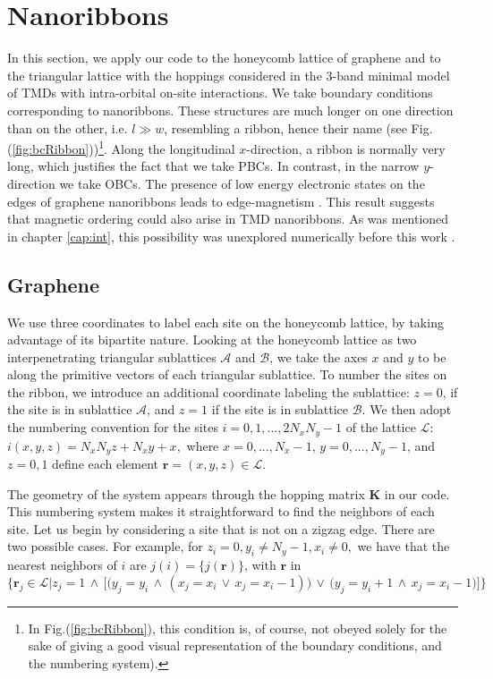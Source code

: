 \section{Nanoribbons}
\label{sec:nanoribbon}

In this section, we apply our code to the honeycomb lattice of graphene and to the triangular lattice with the hoppings considered in the 3-band minimal model of \acs{TMD}s with intra-orbital on-site interactions.
We take boundary conditions corresponding to nanoribbons.
These structures are much longer on one direction than on the other, i.e. $l \gg w$, resembling a ribbon, hence their name (see Fig.(\ref{fig:bcRibbon}))\footnote{In Fig.(\ref{fig:bcRibbon}), this condition is, of course, not obeyed solely for the sake of giving a good visual representation of the boundary conditions, and the numbering system).}.
Along the longitudinal $x$-direction, a ribbon is normally very long, which justifies the fact that we take \acp{PBC}.
In contrast, in the narrow $y$-direction we take \acp{OBC}.
The presence of low energy electronic states on the edges of graphene nanoribbons leads to edge-magnetism  \cite{yazyev_emergence_2010}.
This result suggests that magnetic ordering could also arise in \acs{TMD} nanoribbons.
As was mentioned in chapter \ref{cap:int}, this possibility was unexplored numerically before this work \cite{feldner_dynamical_2011, golor_quantum_2013}.

\subsection{Graphene}
\label{sec:graphene}

We use three coordinates to label each site on the honeycomb lattice, by taking advantage of its bipartite nature.
Looking at the honeycomb lattice as two interpenetrating triangular sublattices $\mathcal{A}$ and $\mathcal{B}$, we take the axes $x$ and $y$ to be along the primitive vectors of each triangular sublattice.
To number the sites on the ribbon, we introduce an additional coordinate labeling the sublattice: $z = 0$, if the site is in sublattice $\mathcal{A}$, and $z = 1$ if the site is in sublattice $\mathcal{B}$.
We then adopt the numbering convention for the sites $i = 0,1, ..., 2 N_x N_y - 1$ of the lattice $\mathcal{L}$:
$
i (x, y, z) = N_x N_y z + N_x y + x,
$
 where $x = 0, ..., N_x - 1$, $y = 0, ..., N_y - 1$, and $z = 0, 1$ define each element $\bm r = (x, y, z) \in \mathcal{L}$.

The geometry of the system appears through the hopping matrix $\bm K$ in our code.
This numbering system makes it straightforward to find the neighbors of each site.
Let us begin by considering a site that is not on a zigzag edge.
There are two possible cases. For example, for 
$
z_i = 0, y_i \neq N_y - 1, x_i \neq 0 ,
$
 we have that the nearest neighbors of $i$ are $ j (i) = \{ j ( \bm r) \}$, with $\bm r$ in
\begin{equation*}
\bigg\{ \bm r_j \in \mathcal{L} \bigg| z_j = 1 \,\land\, \bigg[ \bigg( y_j = y_i  \,\land\, ( x_j = x_i \,\lor\, x_j = x_i - 1) \bigg) \,\lor\, \bigg( y_j = y_i + 1  \,\land\, x_j = x_i - 1  \bigg)  \bigg] \bigg\}
\end{equation*}

